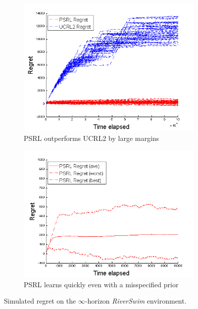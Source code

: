 \begin{figure}[h!]
\centering
\begin{subfigure}{.5\textwidth}
  \centering
  \includegraphics[width=1\linewidth]{Diagrams/combinedGraph.png}
  \caption{PSRL outperforms UCRL2 by large margins}
  \label{fig:sub1}
\end{subfigure}%
\begin{subfigure}{.5\textwidth}
  \centering
  \includegraphics[width=1\linewidth]{Diagrams/psrlGraphShort.png}
  \caption{PSRL learns quickly even with a misspecified prior}
  \label{fig:sub2}
\end{subfigure}
\caption{Simulated regret on the $\infty$-horizon \emph{RiverSwim} environment.}
\label{fig:RiverSwim}
\end{figure}

